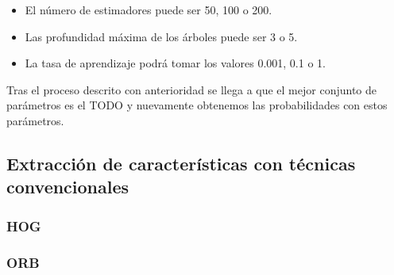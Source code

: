 \begin{itemize}
\item El número de estimadores puede ser 50, 100 o 200.
\item Las profundidad máxima de los árboles puede ser 3 o 5.
\item La tasa de aprendizaje podrá tomar los valores 0.001, 0.1 o 1.
\end{itemize}

Tras el proceso descrito con anterioridad se llega a que el mejor conjunto de parámetros es el TODO y nuevamente obtenemos las probabilidades con estos parámetros.

\subsection{Extracción de características con técnicas convencionales}

\subsubsection{HOG}

\subsubsection{ORB}